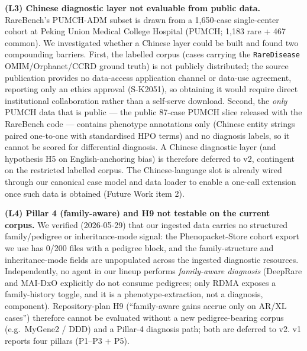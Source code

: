 \textbf{(L3) Chinese diagnostic layer not evaluable from public data.} RareBench's
PUMCH-ADM subset is drawn from a 1,650-case single-center cohort at Peking
Union Medical College Hospital (PUMCH; 1,183 rare + 467 common). We
investigated whether a Chinese layer could be built and found two compounding
barriers. First, the labelled corpus (cases carrying the \texttt{RareDisease}
OMIM/Orphanet/CCRD ground truth) is not publicly distributed; the source
publication provides no data-access application channel or data-use agreement, reporting only an ethics approval (S-K2051), so obtaining it would
require direct institutional collaboration rather than a self-serve download.
Second, the \emph{only} PUMCH data that is public --- the public 87-case PUMCH slice
released with the RareBench code --- contains phenotype annotations only (Chinese entity strings paired one-to-one with standardised HPO terms)
and no diagnosis labels, so it cannot be scored for differential
diagnosis. A Chinese diagnostic layer (and hypothesis H5 on English-anchoring
bias) is therefore deferred to v2, contingent on the restricted labelled
corpus. The Chinese-language slot is already wired through our canonical case
model and data loader to enable a one-call extension once such data is obtained
(Future Work item 2).

\textbf{(L4) Pillar 4 (family-aware) and H9 not testable on the current corpus.} We verified (2026-05-29) that our ingested data carries no
structured family/pedigree or inheritance-mode signal: the
Phenopacket-Store cohort export we use has 0/200 files with a pedigree
block, and the family-structure and inheritance-mode fields are
unpopulated across the ingested diagnostic resources.
Independently, no agent in our lineup performs \emph{family-aware diagnosis}
(DeepRare and MAI-DxO explicitly do not consume pedigrees; only RDMA
exposes a family-history toggle, and it is a phenotype-extraction, not a
diagnosis, component). Repository-plan H9 (``family-aware gains accrue
only on AR/XL cases'') therefore cannot be evaluated without a new
pedigree-bearing corpus (e.g.~MyGene2 / DDD) and a Pillar-4 diagnosis
path; both are deferred to v2. v1 reports four pillars (P1--P3 + P5).

